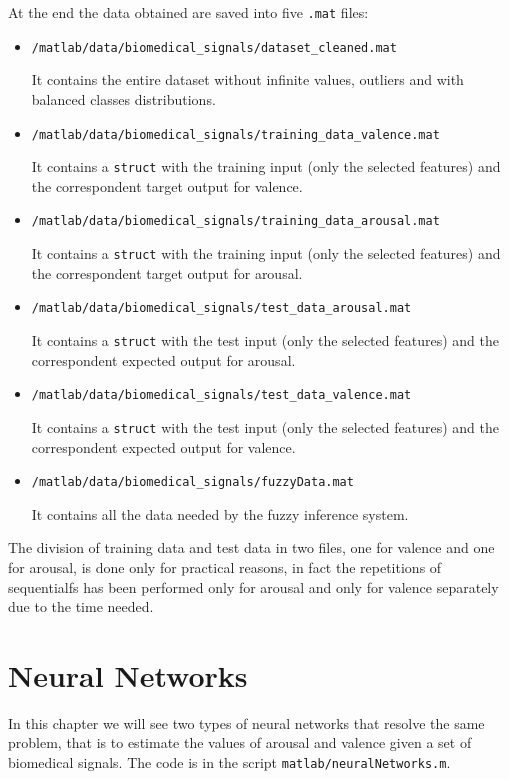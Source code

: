\documentclass[a4paper]{report}
\begin{document}
	\noindent At the end the data obtained are saved into five \texttt{.mat} files:
	\begin{itemize}
		\item \texttt{/matlab/data/biomedical\_signals/dataset\_cleaned.mat}
		
		\noindent It contains the entire dataset without infinite values, outliers and with balanced classes distributions.
		
		\item \texttt{/matlab/data/biomedical\_signals/training\_data\_valence.mat}
		
		\noindent It contains a \texttt{struct} with the training input (only the selected features) and the correspondent target output for valence.
		
		\item \texttt{/matlab/data/biomedical\_signals/training\_data\_arousal.mat}
		
		\noindent It contains a \texttt{struct} with the training input (only the selected features) and the correspondent target output for arousal.
		
		\item \texttt{/matlab/data/biomedical\_signals/test\_data\_arousal.mat}
		
		\noindent It contains a \texttt{struct} with the test input (only the selected features) and the correspondent expected output for arousal.
		
		\item \texttt{/matlab/data/biomedical\_signals/test\_data\_valence.mat}
		
		\noindent It contains a \texttt{struct} with the test input (only the selected features) and the correspondent expected output for valence.
		
		\item \texttt{/matlab/data/biomedical\_signals/fuzzyData.mat}
		
		\noindent It contains all the data needed by the fuzzy inference system.
	\end{itemize}

	\noindent The division of training data and test data in two files, one for valence and one for arousal, is done only for practical reasons, in fact the repetitions of sequentialfs has been performed only for arousal and only for valence separately due to the time needed.
	
\chapter{Neural Networks}
	\noindent In this chapter we will see two types of neural networks that resolve the same problem, that is to estimate the values of arousal and valence given a set of biomedical signals. The code is in the script \texttt{matlab/neuralNetworks.m}.	
\end{document}

